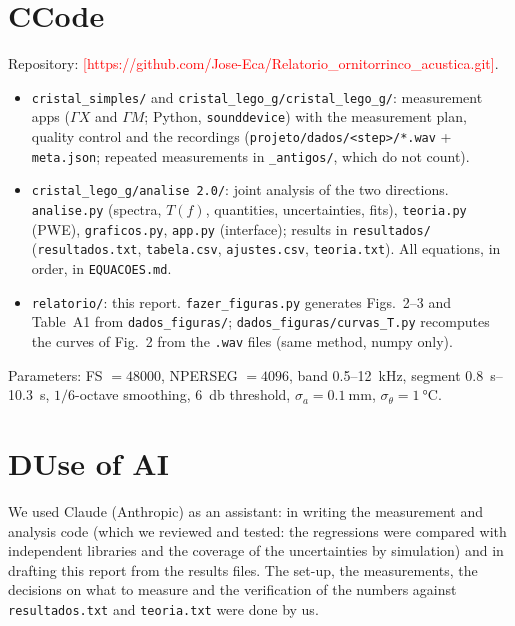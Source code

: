 \documentclass[9pt,a4paper,twocolumn]{extarticle}
\newcommand{\umm}{\milli\metre}
\newcommand{\ukHz}{\kilo\hertz}
\newcommand{\udB}{\decibel}
\newcommand{\GX}{\ensuremath{\Gamma X}}
\newcommand{\GM}{\ensuremath{\Gamma M}}
\begin{document}
\section*{C\quad Code}
Repository: \textcolor{red}{[https://github.com/Jose-Eca/Relatorio_ornitorrinco_acustica.git]}.
\begin{itemize}\setlength{\itemsep}{0pt}
\item \texttt{cristal\_simples/} and \texttt{cristal\_lego\_g/cristal\_lego\_g/}: measurement apps (\GX{} and \GM; Python, \texttt{sounddevice}) with the measurement plan, quality control and the recordings (\texttt{projeto/dados/<step>/*.wav} + \texttt{meta.json}; repeated measurements in \texttt{\_antigos/}, which do not count).
\item \texttt{cristal\_lego\_g/analise 2.0/}: joint analysis of the two directions. \texttt{analise.py} (spectra, $T(f)$, quantities, uncertainties, fits), \texttt{teoria.py} (PWE), \texttt{graficos.py}, \texttt{app.py} (interface); results in \texttt{resultados/} (\texttt{resultados.txt}, \texttt{tabela.csv}, \texttt{ajustes.csv}, \texttt{teoria.txt}). All equations, in order, in \texttt{EQUACOES.md}.
\item \texttt{relatorio/}: this report. \texttt{fazer\_figuras.py} generates Figs.~2--3 and Table~A1 from \texttt{dados\_figuras/}; \texttt{dados\_figuras/curvas\_T.py} recomputes the curves of Fig.~2 from the \texttt{.wav} files (same method, numpy only).
\end{itemize}
Parameters: FS $=48000$, NPERSEG $=4096$, band 0.5--\SI{12}{\ukHz}, segment \SIrange{0.8}{10.3}{\s}, $1/6$-octave smoothing, \SI{6}{\udB} threshold, $\sigma_a=\SI{0.1}{\umm}$, $\sigma_\theta=\SI{1}{\celsius}$.

\section*{D\quad Use of AI}
We used Claude (Anthropic) as an assistant: in writing the measurement and analysis code (which we reviewed and tested: the regressions were compared with independent libraries and the coverage of the uncertainties by simulation) and in drafting this report from the results files. The set-up, the measurements, the decisions on what to measure and the verification of the numbers against \texttt{resultados.txt} and \texttt{teoria.txt} were done by us.
\end{document}
